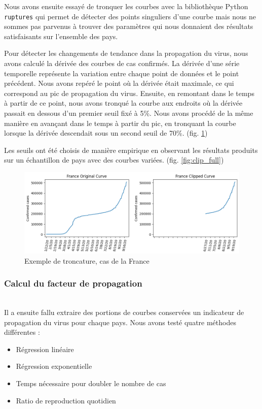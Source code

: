 \documentclass[12pt]{iEEEtran}
\begin{document}
Nous avons ensuite essayé de tronquer les courbes avec la bibliothèque Python \texttt{ruptures} qui
permet de détecter des points singuliers d'une courbe mais nous ne sommes pas parvenus à trouver
des paramètres qui nous donnaient des résultats satisfaisants sur l'ensemble des pays.

Pour détecter les changements de tendance dans la propagation du virus, nous avons calculé la dérivée
des courbes de cas confirmés. La dérivée d'une série temporelle représente la variation entre chaque point
de données et le point précédent. Nous avons repéré le point où la dérivée était maximale, ce qui
correspond au pic de propagation du virus. Ensuite, en remontant dans le temps à partir de ce point,
nous avons tronqué la courbe aux endroits où la dérivée passait en dessous d'un premier seuil fixé à 5\%.
Nous avons procédé de la même manière en avançant dans le temps à partir du pic, en tronquant la courbe
lorsque la dérivée descendait sous un second seuil de 70\%. (fig. \ref{fig:clip})

Les seuils ont été choisis de manière empirique en observant les résultats produits sur un échantillon de pays
avec des courbes variées. (fig. \ref{fig:clip_full})

\begin{figure}[h]
    \centering
    \includegraphics[width=\columnwidth]{img/clip.png}
    \caption{Exemple de troncature, cas de la France}
    \label{fig:clip}
\end{figure}

\subsubsection{Calcul du facteur de propagation}\hfill\\
Il a ensuite fallu extraire des portions de courbes conservées un indicateur de propagation du virus
pour chaque pays. Nous avons testé quatre méthodes différentes :
\begin{itemize}
    \item Régression linéaire
    \item Régression exponentielle
    \item Temps nécessaire pour doubler le nombre de cas
    \item Ratio de reproduction quotidien
\end{itemize}
\end{document}
